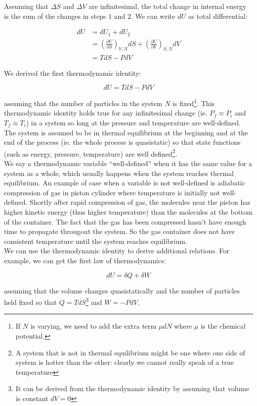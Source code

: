 Assuming that $\Delta S$ and $\Delta V$ are infinitesimal, the total change in internal energy is the sum of the changes in steps $1$ and $2$. We can write $dU$ as total differential:

\begin{align*}
	dU&=dU_1+dU_2 \\
	&=\left( \frac{\partial U}{\partial S} \right)_{V,N} dS+\left( \frac{\partial U}{\partial V} \right)_{S,N} dV \\
	&=TdS-PdV
\end{align*}

We derived the first thermodynamic identity:

\[\boxed{dU=TdS-PdV}\]

assuming that the number of particles in the system $N$ is fixed\footnote{If $N$ is varying, we need to add the extra term $\mu dN$ where $\mu$ is the chemical potential.}. This thermodynamic identity holds true for any infinitesimal change (ie. $P_f\approx P_i$ and $T_f\approx T_i$) in a system so long at the pressure and temperature are well-defined. The system is assumed to be in thermal equilibrium at the beginning and at the end of the process (ie. the whole process is quasistatic) so that state functions (such as energy, pressure, temperature) are well defined\footnote{A system that is not in thermal equilibrium might be one where one side of system is hotter than the other: clearly we cannot really speak of a true temperature}. \\

We say a thermodynamic variable ``well-defined'' when it has the same value for a system as a whole, which usually happens when the system reaches thermal equilibrium. An example of case when a variable is not well-defined is adiabatic compression of gas in piston cylinder where temperature is initially not well-defined. Shortly after rapid compression of gas, the molecules near the piston has higher kinetic energy (thus higher temperature) than the molecules at the bottom of the container. The fact that the gas has been compressed hasn't have enough time to propagate througout the system. So the gas container does not have consistent temperature until the system reaches equilibrium. \\

We can use the thermodynamic identity to derive additional relations. For example, we can get the first law of thermodynamics:

\[dU=\delta Q+\delta W\]

assuming that the volume changes quasistatically and the number of particles held fixed so that $Q=TdS$\footnote{It can be derived from the thermodynamic identity by assuming that volume is constant $dV=0$} and $W=-PdV$. \\

